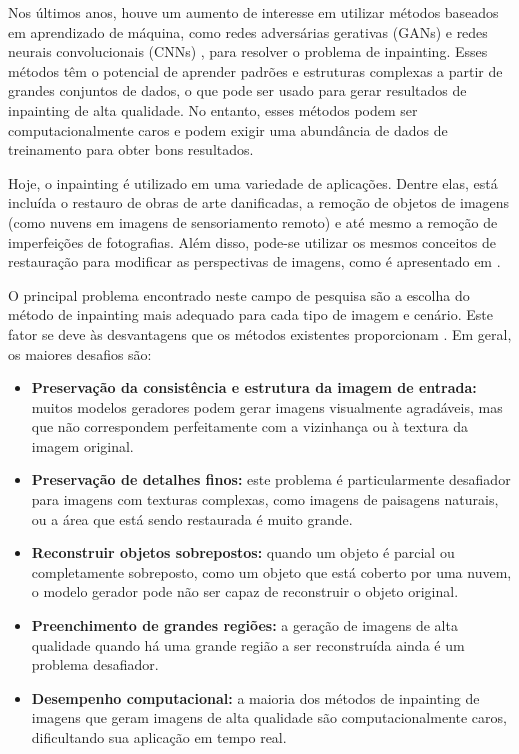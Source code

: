 Nos últimos anos, houve um aumento de interesse em utilizar métodos baseados em aprendizado de máquina, como redes adversárias gerativas (GANs) e redes neurais convolucionais (CNNs) \cite{pathakCVPR16context}, para resolver o problema de inpainting. Esses métodos têm o potencial de aprender padrões e estruturas complexas a partir de grandes conjuntos de dados, o que pode ser usado para gerar resultados de inpainting de alta qualidade. No entanto, esses métodos podem ser computacionalmente caros e podem exigir uma abundância de dados de treinamento para obter bons resultados.

Hoje, o inpainting é utilizado em uma variedade de aplicações. Dentre elas, está incluída o restauro de obras de arte danificadas, a remoção de objetos de imagens (como nuvens em imagens de sensoriamento remoto) e até mesmo a
remoção de imperfeições de fotografias. Além disso, pode-se utilizar os mesmos conceitos de restauração para modificar as perspectivas de imagens, como é apresentado em \cite{huang2014image}.

O principal problema encontrado neste campo de pesquisa são a escolha do método de inpainting mais adequado para cada tipo de imagem e cenário. Este fator se deve às desvantagens que os métodos existentes proporcionam \cite{Salem2021}. Em geral, os maiores desafios são:
\begin{itemize} 
  \item \textbf{Preservação da consistência e estrutura da imagem de entrada:} muitos modelos geradores podem gerar imagens visualmente agradáveis, mas que não correspondem perfeitamente com a vizinhança ou à textura da imagem original.
  \item \textbf{Preservação de detalhes finos:} este problema é particularmente desafiador para imagens com texturas complexas, como imagens de paisagens naturais, ou a área que está sendo restaurada é muito grande.
  \item \textbf{Reconstruir objetos sobrepostos:} quando um objeto é parcial ou completamente sobreposto, como um objeto que está coberto por uma nuvem, o modelo gerador pode não ser capaz de reconstruir o objeto original.
  \item \textbf{Preenchimento de grandes regiões:} a geração de imagens de alta qualidade quando há uma grande região a ser reconstruída ainda é um problema desafiador.
  \item \textbf{Desempenho computacional:} a maioria dos métodos de inpainting de imagens que geram imagens de alta qualidade são computacionalmente caros, dificultando sua aplicação em tempo real.
\end{itemize}


